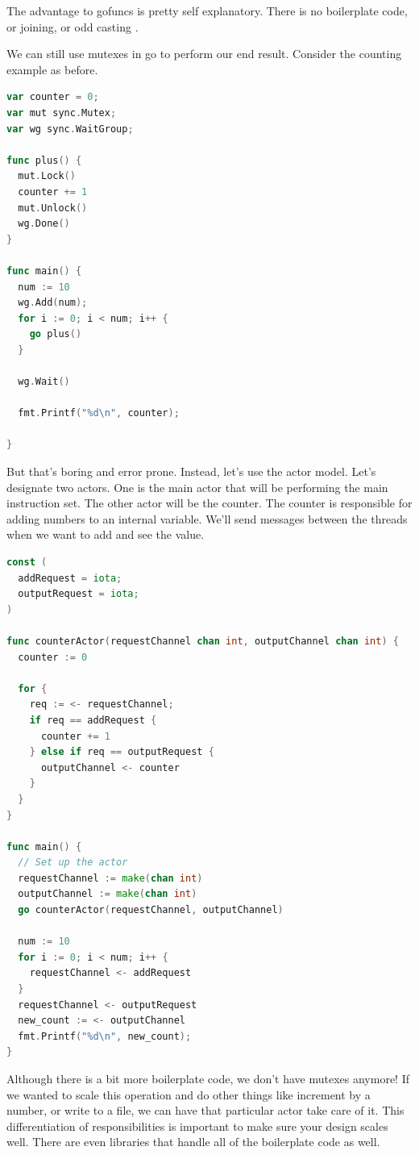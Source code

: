 The advantage to gofuncs is pretty self explanatory.
There is no boilerplate code, or joining, or odd casting .

We can still use mutexes in go to perform our end result.
Consider the counting example as before.

\begin{lstlisting}[language=Go]
var counter = 0;
var mut sync.Mutex;
var wg sync.WaitGroup;
 
func plus() {
  mut.Lock()
  counter += 1
  mut.Unlock()
  wg.Done()
}

func main() {
  num := 10
  wg.Add(num);
  for i := 0; i < num; i++ {
    go plus()
  }

  wg.Wait()

  fmt.Printf("%d\n", counter);

}
\end{lstlisting}

But that's boring and error prone.
Instead, let's use the actor model.
Let's designate two actors.
One is the main actor that will be performing the main instruction set.
The other actor will be the counter.
The counter is responsible for adding numbers to an internal variable.
We'll send messages between the threads when we want to add and see the value.


\begin{lstlisting}[language=Go]
const (
  addRequest = iota;
  outputRequest = iota;
)

func counterActor(requestChannel chan int, outputChannel chan int) {
  counter := 0

  for {
    req := <- requestChannel;
    if req == addRequest {
      counter += 1
    } else if req == outputRequest {
      outputChannel <- counter
    }
  }
}

func main() {
  // Set up the actor
  requestChannel := make(chan int)
  outputChannel := make(chan int)
  go counterActor(requestChannel, outputChannel)

  num := 10
  for i := 0; i < num; i++ {
    requestChannel <- addRequest
  }
  requestChannel <- outputRequest
  new_count := <- outputChannel
  fmt.Printf("%d\n", new_count);
}
\end{lstlisting}

Although there is a bit more boilerplate code, we don't have mutexes anymore!
If we wanted to scale this operation and do other things like increment by a number, or write to a file, we can have that particular actor take care of it.
This differentiation of responsibilities is important to make sure your design scales well.
There are even libraries that handle all of the boilerplate code as well.


